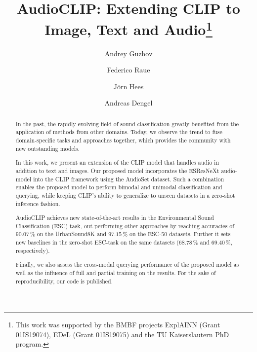 \documentclass[runningheads]{llncs}
\newif\ifreview
\begin{document}
\def\SubNumber{000}

\def\GCPRTrack{Regular Track}


\ifreview
\title{AudioCLIP: Extending CLIP to Image, Text and Audio}
\else
\title{AudioCLIP: Extending CLIP to Image, Text and Audio\thanks{This work was supported by the BMBF projects ExplAINN (Grant 01IS19074), EDeL (Grant 01IS19075) and the TU Kaiserslautern PhD program.}}
\fi


\ifreview
\titlerunning{DAGM GCPR 2021 Submission \SubNumber{}. CONFIDENTIAL REVIEW COPY.}
	\authorrunning{DAGM GCPR 2021 Submission \SubNumber{}. CONFIDENTIAL REVIEW COPY.}
	\author{DAGM GCPR 2021 - \GCPRTrack{}}
	\institute{Paper ID \SubNumber}
\else


	\author{
	    Andrey Guzhov  \and
	    Federico Raue  \and
	    J\"orn Hees  \and
	    Andreas Dengel  }
	


\fi

\maketitle              

\begin{abstract}
In the past, the rapidly evolving field of sound classification greatly benefited from the application of methods from other domains.
Today, we observe the trend to fuse domain-specific tasks and approaches together, which provides the community with new outstanding models.

In this work, we present an extension of the \mbox{CLIP} model that handles audio in addition to text and images.
Our proposed model incorporates the \mbox{ESResNeXt} audio-model into the \mbox{CLIP} framework using the \mbox{AudioSet} dataset.
Such a combination enables the proposed model to perform bimodal and unimodal classification and querying, while keeping \mbox{CLIP's} ability to generalize to unseen datasets in a zero-shot inference fashion.

AudioCLIP achieves new state-of-the-art results in the Environmental Sound Classification (ESC) task, out-performing other approaches by reaching accuracies of $90.07\,\%$ on the \mbox{UrbanSound8K} and $97.15\,\%$ on the \mbox{ESC-50} datasets.
Further it sets new baselines in the zero-shot ESC-task on the same datasets ($68.78\,\%$ and $69.40\,\%$, respectively).

Finally, we also assess the cross-modal querying performance of the proposed model as well as the influence of full and partial training on the results.
For the sake of reproducibility, our code is published.

\end{abstract}
\end{document}
